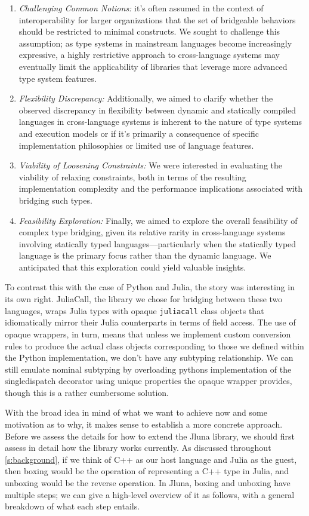 \begin{enumerate}
  \item \textit{Challenging Common Notions:} it's often assumed in the context of interoperability for larger organizations that the set of bridgeable behaviors should be restricted to minimal constructs. We sought to challenge this assumption; as type systems in mainstream languages become increasingly expressive, a highly restrictive approach to cross-language systems may eventually limit the applicability of libraries that leverage more advanced type system features.
  \item \textit{Flexibility Discrepancy:} Additionally, we aimed to clarify whether the observed discrepancy in flexibility between dynamic and statically compiled languages in cross-language systems is inherent to the nature of type systems and execution models or if it's primarily a consequence of specific implementation philosophies or limited use of language features.
  \item \textit{Viability of Loosening Constraints:} We were interested in evaluating the viability of relaxing constraints, both in terms of the resulting implementation complexity and the performance implications associated with bridging such types.
  \item \textit{Feasibility Exploration:} Finally, we aimed to explore the overall feasibility of complex type bridging, given its relative rarity in cross-language systems involving statically typed languages—particularly when the statically typed language is the primary focus rather than the dynamic language. We anticipated that this exploration could yield valuable insights.
\end{enumerate}

To contrast this with the case of Python and Julia, the story was interesting in its own right. JuliaCall, the library we chose for bridging between these two languages, wraps Julia types with opaque \texttt{juliacall} class objects that idiomatically mirror their Julia counterparts in terms of field access. The use of opaque wrappers, in turn, means that unless we implement custom conversion rules to produce the actual class objects corresponding to those we defined within the Python implementation, we don't have any subtyping relationship. We can still emulate nominal subtyping by overloading pythons implementation of the singledispatch decorator using unique properties the opaque wrapper provides, though this is a rather cumbersome solution. 

With the broad idea in mind of what we want to achieve now and some motivation as to why, it makes sense to establish a more concrete approach. Before we assess the details for how to extend the Jluna library, we should first assess in detail how the library works currently. As discussed throughout \ref{s:background}, if we think of C++ as our host language and Julia as the guest, then boxing would be the operation of representing a C++ type in Julia, and unboxing would be the reverse operation. In Jluna, boxing and unboxing have multiple steps; we can give a high-level overview of it as follows, with a general breakdown of what each step entails.

